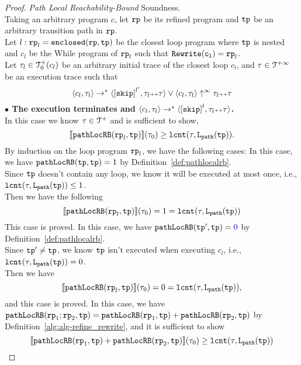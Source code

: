 \begin{proof}
\emph{Path Local Reachability-Bound} Soundness.
\\
Taking an arbitrary program $c$, let $\mathtt{rp}$ be its refined program and $\mathtt{tp}$ be an arbitrary transition path in $\mathtt{rp}$.
\\
Let $l: \mathtt{rp}_l = \mathtt{enclosed}(\mathtt{rp}, \mathtt{tp})$ be the closest loop program where $\mathtt{tp}$ is nested and $c_l$ be the While program of $\mathtt{rp}_l$ such that $\mathtt{Rewrite(c_l)} = \mathtt{rp}_l$. 
\\
Let $\mathtt{\tau}_l \in \mathcal{T}^{+}_0(c_l)$ be an arbitrary initial trace of the closest loop $c_l$, and $\mathtt{\tau} \in \mathcal{T}^{+\infty} $ be an execution trace such that
\[
  \config{c_l, \trace_l} \to^* \config{\clabel{\eskip}^{l'}, \trace_l \tracecat \trace} \lor \config{c_l, \trace_l} \uparrow^{\infty} \trace_l \tracecat \trace 
\]
\textbf{$\bullet$ The execution terminates and {$\config{{c_l}, \trace_l} \to^{*} \config{\clabel{\eskip}^{l}, \trace_l \tracecat \trace}$}.} 
\\
 In this case we know $\mathtt{\tau} \in \mathcal{T}^{+}$ and is sufficient to show,
\[
  \llbracket \mathtt{pathLocRB}(\mathtt{rp}_l, \mathtt{tp}) \rrbracket(\mathtt{\tau}_0) \geq \mathtt{lcnt}(\mathtt{\tau}, \mathtt{L}_{\mathtt{path}}(\mathtt{tp})).
\]
By induction on the loop program $\mathtt{rp}_l$,
we have the following cases:
In this case, we have $\mathtt{pathLocRB}(\mathtt{tp}, \mathtt{tp}) = 1$ by Definition~\ref{def:pathlocalrb}. 
\\
Since $\mathtt{tp}$ doesn't contain any loop, we know it will be executed at most once,  i.e., $\mathtt{lcnt}(\mathtt{\tau}, \mathtt{L}_{\mathtt{path}}(\mathtt{tp})) \leq 1$.
\\
Then we have the following
\[\llbracket \mathtt{pathLocRB}(\mathtt{rp}_l, \mathtt{tp}) \rrbracket(\mathtt{\tau}_0) = 1 = \mathtt{lcnt}(\mathtt{\tau}, \mathtt{L}_{\mathtt{path}}(\mathtt{tp})) \]
This case is proved.
In this case, we have $\outinB(\tpath', \tpath) = \highlight{0} $ by Definition~\ref{def:pathlocalrb}.
\\
Since $\mathtt{tp}' \neq \mathtt{tp}$, we know $\mathtt{tp}$ isn't executed when executing $c_l$, i.e., $\mathtt{lcnt}(\mathtt{\tau}, \mathtt{L}_{\mathtt{path}}(\mathtt{tp})) = 0$.
\\
Then we have
\[
  \llbracket \mathtt{pathLocRB}(\mathtt{rp}_l, \mathtt{tp}) \rrbracket(\mathtt{\tau}_0) = 0 = \mathtt{lcnt}(\mathtt{\tau}, \mathtt{L}_{\mathtt{path}}(\mathtt{tp})),
  \]
and this case is proved.
In this case, we have $\mathtt{pathLocRB}(\mathtt{rp}_1;\mathtt{rp}_2, \mathtt{tp}) = \mathtt{pathLocRB}(\mathtt{rp}_1, \mathtt{tp}) + \mathtt{pathLocRB}(\mathtt{rp}_2, \mathtt{tp}) $ by Definition~\ref{alg:alg-refine_rewrite}, and
it is sufficient to show
\[
  \llbracket \mathtt{pathLocRB}(\mathtt{rp}_1, \mathtt{tp}) + \mathtt{pathLocRB}(\mathtt{rp}_2, \mathtt{tp}) \rrbracket(\mathtt{\tau}_0) \geq \mathtt{lcnt}(\mathtt{\tau}, \mathtt{L}_{\mathtt{path}}(\mathtt{tp})) 
\]
\end{proof}

